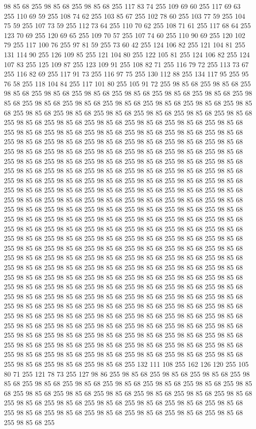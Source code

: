98 85 68 255 98 85 68 255 98 85 68 255 117 83 74 255 109 69 60 255 117 69 63 255 110 69 59 255 108 74 62 255 103 85 67 255 102 78 60 255 103 77 59 255 104 75 59 255 107 73 59 255 112 73 64 255 110 70 62 255 108 71 61 255 117 68 64 255 123 70 69 255 120 69 65 255 109 70 57 255 107 74 60 255 110 90 69 255 120 102 79 255 117 100 76 255 97 81 59 255 73 60 42 255 124 106 82 255 121 104 81 255 131 114 90 255 126 109 85 255 121 104 80 255 122 105 81 255 124 106 82 255 124 107 83 255 125 109 87 255 123 109 91 255 108 82 71 255 116 79 72 255 113 73 67 255 116 82 69 255 117 91 73 255 116 97 75 255 130 112 88 255 134 117 95 255 95 76 58 255 118 104 84 255 117 101 80 255 105 91 72 255 98 85 68 255 98 85 68 255 98 85 68 255 98 85 68 255 98 85 68 255 98 85 68 255 98 85 68 255 98 85 68 255 98 85 68 255 98 85 68 255 98 85 68 255 98 85 68 255 98 85 68 255 98 85 68 255 98 85 68 255 98 85 68 255
98 85 68 255 98 85 68 255 98 85 68 255 98 85 68 255 98 85 68 255 98 85 68 255 98 85 68 255 98 85 68 255 98 85 68 255 98 85 68 255 98 85 68 255 98 85 68 255 98 85 68 255 98 85 68 255 98 85 68 255 98 85 68 255 98 85 68 255 98 85 68 255 98 85 68 255 98 85 68 255 98 85 68 255 98 85 68 255 98 85 68 255 98 85 68 255 98 85 68 255 98 85 68 255 98 85 68 255 98 85 68 255 98 85 68 255 98 85 68 255 98 85 68 255 98 85 68 255 98 85 68 255 98 85 68 255 98 85 68 255 98 85 68 255 98 85 68 255 98 85 68 255 98 85 68 255 98 85 68 255 98 85 68 255 98 85 68 255 98 85 68 255 98 85 68 255 98 85 68 255 98 85 68 255 98 85 68 255 98 85 68 255 98 85 68 255 98 85 68 255 98 85 68 255 98 85 68 255 98 85 68 255 98 85 68 255 98 85 68 255 98 85 68 255 98 85 68 255 98 85 68 255 98 85 68 255 98 85 68 255 98 85 68 255 98 85 68 255 98 85 68 255 98 85 68 255
98 85 68 255 98 85 68 255 98 85 68 255 98 85 68 255 98 85 68 255 98 85 68 255 98 85 68 255 98 85 68 255 98 85 68 255 98 85 68 255 98 85 68 255 98 85 68 255 98 85 68 255 98 85 68 255 98 85 68 255 98 85 68 255 98 85 68 255 98 85 68 255 98 85 68 255 98 85 68 255 98 85 68 255 98 85 68 255 98 85 68 255 98 85 68 255 98 85 68 255 98 85 68 255 98 85 68 255 98 85 68 255 98 85 68 255 98 85 68 255 98 85 68 255 98 85 68 255 98 85 68 255 98 85 68 255 98 85 68 255 98 85 68 255 98 85 68 255 98 85 68 255 98 85 68 255 98 85 68 255 98 85 68 255 98 85 68 255 98 85 68 255 98 85 68 255 98 85 68 255 98 85 68 255 98 85 68 255 98 85 68 255 98 85 68 255 98 85 68 255 98 85 68 255 98 85 68 255 98 85 68 255 98 85 68 255 98 85 68 255 98 85 68 255 98 85 68 255 98 85 68 255 98 85 68 255 98 85 68 255 98 85 68 255 98 85 68 255 98 85 68 255 98 85 68 255
98 85 68 255 98 85 68 255 98 85 68 255 98 85 68 255 98 85 68 255 98 85 68 255 98 85 68 255 98 85 68 255 98 85 68 255 98 85 68 255 98 85 68 255 98 85 68 255 98 85 68 255 98 85 68 255 98 85 68 255 98 85 68 255 98 85 68 255 98 85 68 255 98 85 68 255 98 85 68 255 98 85 68 255 98 85 68 255 98 85 68 255 98 85 68 255 98 85 68 255 98 85 68 255 98 85 68 255 98 85 68 255 98 85 68 255 98 85 68 255 132 111 108 255 162 126 120 255 105 80 71 255 121 78 73 255 127 98 86 255 98 85 68 255 98 85 68 255 98 85 68 255 98 85 68 255 98 85 68 255 98 85 68 255 98 85 68 255 98 85 68 255 98 85 68 255 98 85 68 255 98 85 68 255 98 85 68 255 98 85 68 255 98 85 68 255 98 85 68 255 98 85 68 255 98 85 68 255 98 85 68 255 98 85 68 255 98 85 68 255 98 85 68 255 98 85 68 255 98 85 68 255 98 85 68 255 98 85 68 255 98 85 68 255 98 85 68 255 98 85 68 255 98 85 68 255
